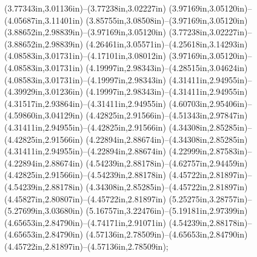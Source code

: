 (3.77343in,3.01136in)--(3.77238in,3.02227in) (3.97169in,3.05120in)--(4.05687in,3.11401in) (3.85755in,3.08508in)--(3.97169in,3.05120in) (3.88652in,2.98839in)--(3.97169in,3.05120in) (3.77238in,3.02227in)--(3.88652in,2.98839in) (4.26461in,3.05571in)--(4.25618in,3.14293in) (4.08583in,3.01731in)--(4.17101in,3.08012in) (3.97169in,3.05120in)--(4.08583in,3.01731in) (4.19997in,2.98343in)--(4.28515in,3.04624in) (4.08583in,3.01731in)--(4.19997in,2.98343in) (4.31411in,2.94955in)--(4.39929in,3.01236in) (4.19997in,2.98343in)--(4.31411in,2.94955in) (4.31517in,2.93864in)--(4.31411in,2.94955in) (4.60703in,2.95406in)--(4.59860in,3.04129in) (4.42825in,2.91566in)--(4.51343in,2.97847in) (4.31411in,2.94955in)--(4.42825in,2.91566in) (4.34308in,2.85285in)--(4.42825in,2.91566in) (4.22894in,2.88674in)--(4.34308in,2.85285in) (4.31411in,2.94955in)--(4.22894in,2.88674in) (4.22999in,2.87583in)--(4.22894in,2.88674in) (4.54239in,2.88178in)--(4.62757in,2.94459in) (4.42825in,2.91566in)--(4.54239in,2.88178in) (4.45722in,2.81897in)--(4.54239in,2.88178in) (4.34308in,2.85285in)--(4.45722in,2.81897in) (4.45827in,2.80807in)--(4.45722in,2.81897in) (5.25275in,3.28757in)--(5.27699in,3.03680in) (5.16757in,3.22476in)--(5.19181in,2.97399in) (4.65653in,2.84790in)--(4.74171in,2.91071in) (4.54239in,2.88178in)--(4.65653in,2.84790in) (4.57136in,2.78509in)--(4.65653in,2.84790in) (4.45722in,2.81897in)--(4.57136in,2.78509in);
